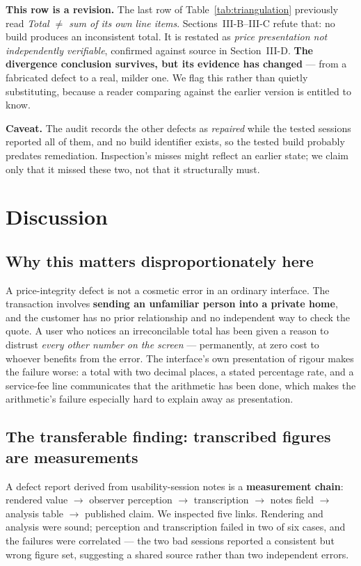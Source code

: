\documentclass[conference]{IEEEtran}
\begin{document}
\textbf{This row is a revision.} The last row of Table~\ref{tab:triangulation} previously read \emph{Total
$\neq$ sum of its own line items}. Sections~III-B--III-C refute that: no build produces an
inconsistent total. It is restated as \emph{price presentation not independently verifiable},
confirmed against source in Section~III-D. \textbf{The divergence conclusion survives, but its
evidence has changed} --- from a fabricated defect to a real, milder one. We flag this rather than
quietly substituting, because a reader comparing against the earlier version is entitled to know.

\textbf{Caveat.} The audit records the other defects as \emph{repaired} while the tested sessions
reported all of them, and no build identifier exists, so the tested build probably predates
remediation. Inspection's misses might reflect an earlier state; we claim only that it missed these
two, not that it structurally must.

\section{Discussion}

\subsection{Why this matters disproportionately here}

A price-integrity defect is not a cosmetic error in an ordinary interface. The transaction involves
\textbf{sending an unfamiliar person into a private home}, and the customer has no prior relationship and
no independent way to check the quote. A user who notices an irreconcilable total has been given a
reason to distrust \emph{every other number on the screen} --- permanently, at zero cost to whoever
benefits from the error. The interface's own presentation of rigour makes the failure worse: a total
with two decimal places, a stated percentage rate, and a service-fee line communicates that the
arithmetic has been done, which makes the arithmetic's failure especially hard to explain away as
presentation.

\subsection{The transferable finding: transcribed figures are measurements}

A defect report derived from usability-session notes is a \textbf{measurement chain}: rendered value
$\rightarrow$ observer perception $\rightarrow$ transcription $\rightarrow$ notes field $\rightarrow$
analysis table $\rightarrow$ published claim. We inspected five links. Rendering and analysis were
sound; perception and transcription failed in two of six cases, and the failures were correlated --- the
two bad sessions reported a consistent but wrong figure set, suggesting a shared source rather than two
independent errors.
\end{document}
